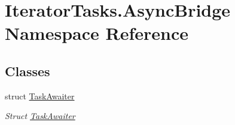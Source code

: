 \hypertarget{namespace_iterator_tasks_1_1_async_bridge}{}\section{Iterator\+Tasks.\+Async\+Bridge Namespace Reference}
\label{namespace_iterator_tasks_1_1_async_bridge}
\subsection*{Classes}
\begin{DoxyCompactItemize}
\item 
struct \hyperlink{struct_iterator_tasks_1_1_async_bridge_1_1_task_awaiter}{Task\+Awaiter}
\begin{DoxyCompactList}\small\item\em Struct \hyperlink{struct_iterator_tasks_1_1_async_bridge_1_1_task_awaiter}{Task\+Awaiter} \end{DoxyCompactList}\end{DoxyCompactItemize}

